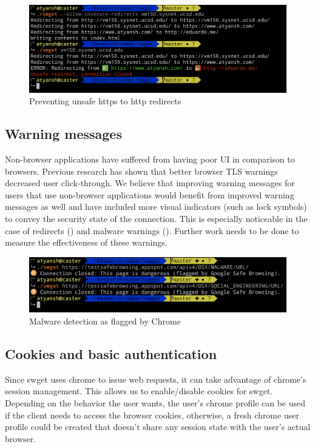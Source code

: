 \begin{figure}[h]
  \includegraphics[width=\textwidth]{figures/redirect}
  \caption{Preventing unsafe https to http redirects} 
  \label{fig:redirect-saber}
\end{figure}

\subsection{Warning messages}
Non-browser applications have suffered from having poor UI in comparison to
browsers. Previous research has shown that better browser TLS warnings
decreased user click-through. We believe that improving warning messages for
users that use non-browser applications would benefit from improved warning
messages as well and have included more visual indicators (such as lock symbols)
to convey the security state of the connection. This is especially noticeable
in the case of redirects () and malware warnings
(). Further work needs to be done to measure the
effectiveness of these warnings.

\begin{figure}[h]
  \includegraphics[width=\textwidth]{figures/malware}
  \caption{Malware detection as flagged by Chrome} 
  \label{fig:malware-saber}
\end{figure}

\subsection{Cookies and basic authentication}
Since swget uses chrome to issue web requests, it can take advantage of
chrome's session management. This allows us to enable/disable cookies for
swget. Depending on the behavior the user wants, the user's chrome profile can
be used if the client needs to access the browser cookies, otherwise, a fresh
chrome user profile could be created that doesn't share any session state with
the user's actual browser.

